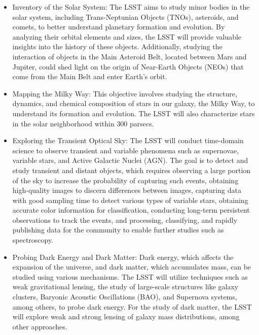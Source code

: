 \begin{itemize}
    \item Inventory of the Solar System: The LSST aims to study minor bodies in the solar system, including Trans-Neptunian Objects (TNOs), asteroids, and comets, to better understand planetary formation and evolution. By analyzing their orbital elements and sizes, the LSST will provide valuable insights into the history of these objects. Additionally, studying the interaction of objects in the Main Asteroid Belt, located between Mars and Jupiter, could shed light on the origin of Near-Earth Objects (NEOs) that come from the Main Belt and enter Earth's orbit.

    \item Mapping the Milky Way: This objective involves studying the structure, dynamics, and chemical composition of stars in our galaxy, the Milky Way, to understand its formation and evolution. The LSST will also characterize stars in the solar neighborhood within 300 parsecs.

    \item Exploring the Transient Optical Sky: The LSST will conduct time-domain science to observe transient and variable phenomena such as supernovae, variable stars, and Active Galactic Nuclei (AGN). The goal is to detect and study transient and distant objects, which requires observing a large portion of the sky to increase the probability of capturing such events, obtaining high-quality images to discern differences between images, capturing data with good sampling time to detect various types of variable stars, obtaining accurate color information for classification, conducting long-term persistent observations to track the events, and processing, classifying, and rapidly publishing data for the community to enable further studies such as spectroscopy.

    \item Probing Dark Energy and Dark Matter: Dark energy, which affects the expansion of the universe, and dark matter, which accumulates mass, can be studied using various mechanisms. The LSST will utilize techniques such as weak gravitational lensing, the study of large-scale structures like galaxy clusters, Baryonic Acoustic Oscillations (BAO), and Supernova systems, among others, to probe dark energy. For the study of dark matter, the LSST will explore weak and strong lensing of galaxy mass distributions, among other approaches.

\end{itemize}

